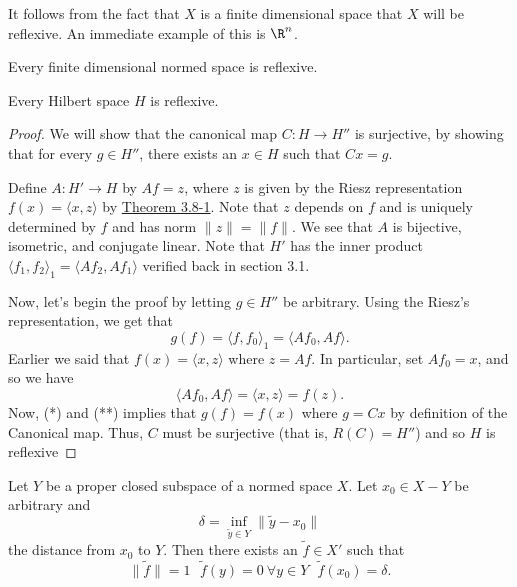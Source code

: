  It follows from the fact that \( X  \) is a finite dimensional space that \( X  \) will be reflexive. An immediate example of this is \( \R^{n} \).

 \begin{theorem}
     Every finite dimensional normed space is reflexive.
 \end{theorem}

 \begin{theorem}
     Every Hilbert space \( H  \) is reflexive.
 \end{theorem}
\begin{proof}
    We will show that the canonical map \( C: H \to H'' \) is surjective, by showing that for every \( g \in H'' \), there exists an \( x \in H  \) such that \( Cx = g  \).

    Define \( A : H' \to H  \) by \( Af = z  \), where \( z  \) is given by the Riesz representation \( f(x) = \langle x , z \rangle \) by {\hyperref[3.8-1]{Theorem 3.8-1}}. Note that \( z  \) depends on \( f  \) and is uniquely determined by \( f  \) and has norm \( \|z\| = \|f\| \). We see that \( A  \) is bijective, isometric, and conjugate linear. Note that \( H' \) has the inner product \( \langle {f}_{1} ,  {f}_{2} \rangle_{1} = \langle A {f}_{2} ,  A {f}_{1} \rangle \) verified back in section 3.1. 

    Now, let's begin the proof by letting \( g \in H'' \) be arbitrary. Using the Riesz's representation, we get that 
    \[  g(f) = \langle f  ,  {f}_{0} \rangle_1 = \langle A {f}_{0} ,  A f  \rangle. \tag{*} \]
    Earlier we said that \( f(x) = \langle x , z \rangle  \) where \( z = A f  \). In particular, set \( A {f}_{0} = x  \), and so we have 
    \[ \langle A {f}_{0} ,  A f  \rangle = \langle x  , z \rangle = f(z). \tag{**} \]
    Now, (*) and (**) implies that \( g(f) = f(x) \) where \( g = C x   \) by definition of the Canonical map. Thus, \( C  \) must be surjective (that is, \( R(C) = H'' \)) and so \( H  \) is reflexive
\end{proof}



\begin{lemma}
   Let \( Y  \) be a proper closed subspace of a normed space \( X  \). Let \( {x}_{0} \in X - Y  \) be arbitrary and  
   \[  \delta = \inf_{\tilde{y} \in Y} \|\tilde{y} - {x}_{0}\| \]
   the distance from \( {x}_{0}  \) to \( Y  \). Then there exists an \( \tilde{f} \in X' \) such that 
   \[  \|\tilde{f}\| = 1 \ \ \ \tilde{f}(y) = 0 \ \forall y \in Y \ \ \ \tilde{f}({x}_{0})=  \delta. \]
\end{lemma}

